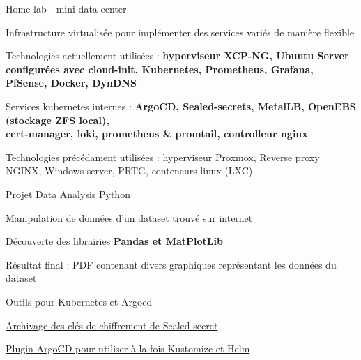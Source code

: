 
\begin{cventries}
  \cventry
    {} %
    {Home lab - mini data center} %
    {} %
    {} %
    {
      \begin{cvitems} %
        \item {Infrastructure virtualisée pour implémenter des services variés de manière flexible}
        \item {Technologies actuellement utilisées : \textbf{hyperviseur XCP-NG, Ubuntu Server configurées avec cloud-init, Kubernetes, Prometheus, Grafana,\\PfSense, Docker, DynDNS}}
        \item {Services kubernetes internes : \textbf{ArgoCD, Sealed-secrets, MetalLB, OpenEBS (stockage ZFS local),\\cert-manager, loki, prometheus \& promtail, controlleur nginx}}
        \item {Technologies précédament utilisées : hyperviseur Proxmox, Reverse proxy NGINX, Windows server, PRTG, conteneurs linux (LXC)}
      \end{cvitems}
    }
  \cventry
      {} %
      {Projet Data Analysis Python} %
      {} %
      {} %
      {
        \begin{cvitems} %
          \item {Manipulation de données d'un dataset trouvé sur internet}
          \item {Découverte des librairies \textbf{Pandas et MatPlotLib}}
          \item {Résultat final : PDF contenant divers graphiques représentant les données du dataset\\}
        \end{cvitems}
      }
  \cventry
      {} %
      {Outils pour Kubernetes et Argocd} %
      {} %
      {} %
      {
        \begin{cvitems} %
          \item {\href{https://github.com/guillheu/kubernetes-sealed-secrets-key-archiver}{Archivage des clés de chiffrement de Sealed-secret}}
          \item {\href{https://github.com/guillheu/argocd-kustomize-helm-cmp}{Plugin ArgoCD pour utiliser à la fois Kustomize et Helm}}
        \end{cvitems}
}
\end{cventries}

